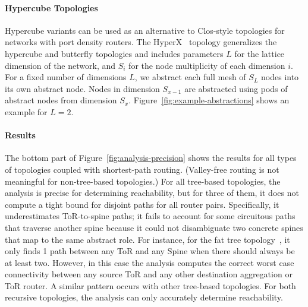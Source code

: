 \documentclass[numbers, 10pt, preprint]{sigplanconf}
\newcommand{\sysname}{{\text{}\small \sf Propane/AT}\xspace}
\newcommand{\para}[1]{\paragraph*{\textbf{#1}}}
\begin{document}
\para{Hypercube Topologies}
Hypercube variants can be used as an alternative to Clos-style topologies for networks with port density routers. The HyperX~\cite{hyperx} topology generalizes the hypercube and butterfly topologies and includes parameters $L$ for the lattice dimension of the network, and $S_i$ for the node multiplicity of each dimension $i$.
For a fixed number of dimensions $L$, we abstract each full mesh of $S_L$ nodes into its own abstract node. Nodes in dimension $S_{x-1}$ are abstracted using pods of abstract nodes from dimension $S_x$. Figure~\ref{fig:example-abstractions} shows an example for $L=2$.

\para{Results}
The bottom part of Figure~\ref{fig:analysis-precision} shows the results for all types of topologies coupled with shortest-path routing. (Valley-free routing is not meaningful for non-tree-based topologies.) For all tree-based topologies, the analysis is precise for determining reachability, but for three of them, it does not compute a tight bound for disjoint paths for all router pairs. Specifically, it underestimates ToR-to-spine paths; it fails to account for some circuitous paths that traverse another spine because it could not disambiguate two concrete spines that map to the same abstract role.
%
For instance, for the fat tree topology~\cite{fattree}, it only finds 1 path between any ToR and any Spine when there should always be at least two. However, in this case the analysis computes the correct worst case connectivity between any source ToR and any other destination aggregation or ToR router. A similar pattern occurs with other tree-based topologies.
%
For both recursive topologies, the analysis can only accurately determine reachability.


%
\end{document}
